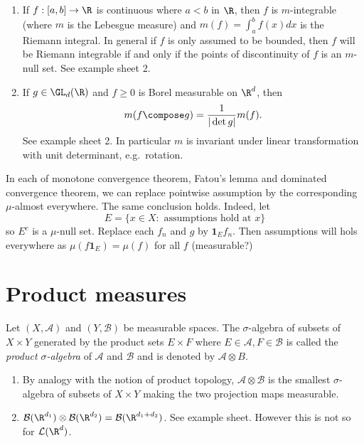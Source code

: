 \documentclass[a4paper]{article}
\begin{document}
\begin{remark}\leavevmode
  \begin{enumerate}
  \item If \(f: [a, b] \to \R\) is continuous where \(a < b\) in \(\R\), then \(f\) is \(m\)-integrable (where \(m\) is the Lebesgue measure) and \(m(f) = \int_a^b f(x)dx\) is the Riemann integral. In general if \(f\) is only assumed to be bounded, then \(f\) will be Riemann integrable if and only if the points of discontinuity of \(f\) is an \(m\)-null set. See example sheet 2.
  \item If \(g \in \GL_d(\R)\) and \(f \geq 0\) is Borel measurable on \(\R^d\), then
    \[
      m(f \compose g) = \frac{1}{|\det g|} m(f).
    \]
    See example sheet 2. In particular \(m\) is invariant under linear transformation with unit determinant, e.g.\ rotation.
  \end{enumerate}
\end{remark}

\begin{remark}
  In each of monotone convergence theorem, Fatou's lemma and dominated convergence theorem, we can replace pointwise assumption by the corresponding \(\mu\)-almost everywhere. The same conclusion holds. Indeed, let
  \[
    E = \{x \in X: \text{ assumptions hold at } x\}
  \]
  so \(E^c\) is a \(\mu\)-null set. Replace each \(f_n\) and \(g\) by \(\mathbf 1_E f_n\). Then assumptions will hols everywhere as \(\mu(f \mathbf 1_E) = \mu(f)\) for all \(f\) (measurable?)
\end{remark}

\section{Product measures}

\begin{definition}
  Let \((X, \mathcal A)\) and \((Y, \mathcal B)\) be measurable spaces. The \(\sigma\)-algebra of subsets of \(X \times Y\) generated by the product sets \(E \times F\) where \(E \in \mathcal A, F \in \mathcal B\) is called the \emph{product \(\sigma\)-algebra} of \(\mathcal A\) and \(\mathcal B\) and is denoted by \(\mathcal A \otimes B\).
\end{definition}

\begin{remark}\leavevmode
  \begin{enumerate}
  \item By analogy with the notion of product topology, \(\mathcal A \otimes \mathcal B\) is the smallest \(\sigma\)-algebra of subsets of \(X \times Y\) making the two projection maps measurable.
  \item \(\mathcal B(\R^{d_1}) \otimes \mathcal B(\R^{d_2}) = \mathcal B(\R^{d_1 + d_2})\). See example sheet. However this is not so for \(\mathcal L(\R^d)\).
  \end{enumerate}
\end{remark}
\end{document}
